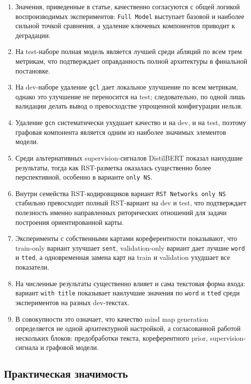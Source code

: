 \documentclass[12pt,a4paper]{article}
\begin{document}
\begin{enumerate}
    \item Значения, приведенные в статье, качественно согласуются с общей логикой
    воспроизводимых экспериментов: \texttt{Full Model} выступает базовой и наиболее
    сильной точкой сравнения, а удаление ключевых компонентов приводит к деградации.
    \item На test-наборе полная модель является лучшей среди абляций по всем трем
    метрикам, что подтверждает оправданность полной архитектуры в финальной постановке.
    \item На dev-наборе удаление \texttt{gcl} дает локальное улучшение по всем метрикам,
    однако это улучшение не переносится на test; следовательно, по одной лишь валидации
    делать вывод о превосходстве упрощенной конфигурации нельзя.
    \item Удаление \texttt{gcn} систематически ухудшает качество и на dev, и на test,
    поэтому графовая компонента является одним из наиболее значимых элементов модели.
    \item Среди альтернативных supervision-сигналов DistilBERT показал наихудшие
    результаты, тогда как RST-разметка оказалась существенно более перспективной,
    особенно в варианте \texttt{only NS}.
    \item Внутри семейства RST-кодировщиков вариант \texttt{RST Networks only NS}
    стабильно превосходит полный RST-вариант на dev и test, что подтверждает полезность
    именно направленных риторических отношений для задачи построения ориентированной карты.
    \item Эксперименты с собственными картами кореферентности показывают, что
    train-only вариант улучшает \texttt{sent}, validation-only вариант дает лучшие
    \texttt{word} и \texttt{tted}, а одновременная замена карт на train и validation
    ухудшает все показатели.
    \item На численные результаты существенно влияет и сама текстовая форма входа:
    вариант \texttt{with title} показывает наилучшие значения по \texttt{word} и
    \texttt{tted} среди экспериментов на разных dev-текстах.
    \item В совокупности это означает, что качество mind map generation определяется
    не одной архитектурной настройкой, а согласованной работой нескольких блоков:
    предобработки текста, кореферентного prior, supervision-сигнала и графовой модели.
\end{enumerate}

\subsection{Практическая значимость}
\end{document}
